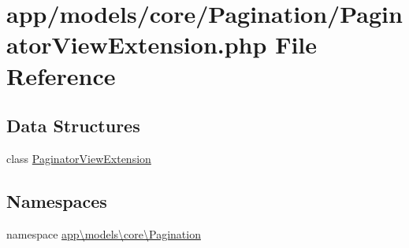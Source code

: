 \hypertarget{_paginator_view_extension_8php}{\section{app/models/core/\-Pagination/\-Paginator\-View\-Extension.php File Reference}
\label{_paginator_view_extension_8php}
}
\subsection*{Data Structures}
\begin{DoxyCompactItemize}
\item 
class \hyperlink{classapp_1_1models_1_1core_1_1_pagination_1_1_paginator_view_extension}{Paginator\-View\-Extension}
\end{DoxyCompactItemize}
\subsection*{Namespaces}
\begin{DoxyCompactItemize}
\item 
namespace \hyperlink{namespaceapp_1_1models_1_1core_1_1_pagination}{app\textbackslash{}models\textbackslash{}core\textbackslash{}\-Pagination}
\end{DoxyCompactItemize}
